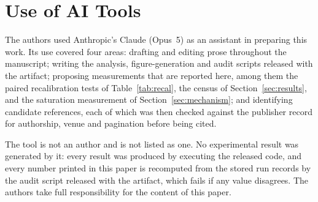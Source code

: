 \documentclass[journal]{IEEEtran}
\begin{document}
\section*{Use of AI Tools}
The authors used Anthropic's Claude (Opus~5) as an assistant in preparing
this work. Its use covered four areas: drafting and editing prose throughout
the manuscript; writing the analysis, figure-generation and audit scripts
released with the artifact; proposing measurements that are reported here,
among them the paired recalibration tests of Table~\ref{tab:recal}, the
census of Section~\ref{sec:results}, and the saturation measurement of
Section~\ref{sec:mechanism}; and identifying candidate references, each of
which was then checked against the publisher record for authorship, venue
and pagination before being cited.

The tool is not an author and is not listed as one. No experimental result
was generated by it: every result was produced by executing the released
code, and every number printed in this paper is recomputed from the stored
run records by the audit script released with the artifact, which fails if
any value disagrees. The authors take full responsibility for the content of
this paper.
\end{document}
